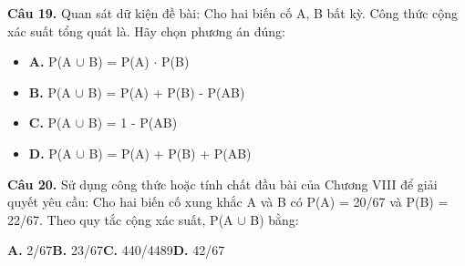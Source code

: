 \documentclass[11pt,a4paper]{article}
\begin{document}
\textbf{\color{primary} Câu 19.} Quan sát dữ kiện đề bài: Cho hai biến cố A, B bất kỳ. Công thức cộng xác suất tổng quát là. Hãy chọn phương án đúng:\par
\begin{itemize}\setlength{\itemsep}{1pt}\setlength{\parskip}{0pt}
  \item[] \textbf{A.} P(A $\cup$ B) = P(A) $\cdot$ P(B)
  \item[] \textbf{B.} P(A $\cup$ B) = P(A) + P(B) - P(AB)
  \item[] \textbf{C.} P(A $\cup$ B) = 1 - P(AB)
  \item[] \textbf{D.} P(A $\cup$ B) = P(A) + P(B) + P(AB)
\end{itemize}\vspace{2pt}
\textbf{\color{primary} Câu 20.} Sử dụng công thức hoặc tính chất đầu bài của Chương VIII để giải quyết yêu cầu: Cho hai biến cố xung khắc A và B có P(A) = 20/67 và P(B) = 22/67. Theo quy tắc cộng xác suất, P(A $\cup$ B) bằng:\par
\hspace*{1.5em}\textbf{A.} 2/67\quad\quad \textbf{B.} 23/67\quad\quad \textbf{C.} 440/4489\quad\quad \textbf{D.} 42/67\par\vspace{2pt}
\end{document}
